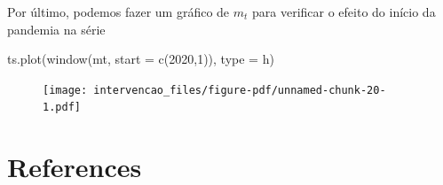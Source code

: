 \documentclass[
  letterpaper,
  DIV=11,
  numbers=noendperiod]{scrartcl}
\newenvironment{Shaded}{\begin{snugshade}}{\end{snugshade}}
\newcommand{\AttributeTok}[1]{\textcolor[rgb]{0.40,0.45,0.13}{#1}}
\newcommand{\DecValTok}[1]{\textcolor[rgb]{0.68,0.00,0.00}{#1}}
\newcommand{\FunctionTok}[1]{\textcolor[rgb]{0.28,0.35,0.67}{#1}}
\newcommand{\NormalTok}[1]{\textcolor[rgb]{0.00,0.23,0.31}{#1}}
\newcommand{\StringTok}[1]{\textcolor[rgb]{0.13,0.47,0.30}{#1}}
\newlength{\cslhangindent}
\newlength{\cslentryspacingunit} %
\newenvironment{CSLReferences}[2] %
 {%
  \setlength{\parindent}{0pt}
  \ifodd #1
  \let\oldpar\par
  \def\par{\hangindent=\cslhangindent\oldpar}
  \fi
  \setlength{\parskip}{#2\cslentryspacingunit}
 }%
 {}
\theoremstyle{plain}
\theoremstyle{plain}
\theoremstyle{definition}
\theoremstyle{definition}
\theoremstyle{remark}
\begin{document}
Por último, podemos fazer um gráfico de \(m_t\) para verificar o efeito
do início da pandemia na série

\begin{Shaded}
\begin{Highlighting}[]
\FunctionTok{ts.plot}\NormalTok{(}\FunctionTok{window}\NormalTok{(mt, }\AttributeTok{start =} \FunctionTok{c}\NormalTok{(}\DecValTok{2020}\NormalTok{,}\DecValTok{1}\NormalTok{)), }\AttributeTok{type =} \StringTok{\textquotesingle{}h\textquotesingle{}}\NormalTok{)}
\end{Highlighting}
\end{Shaded}

\begin{figure}[H]

{\centering \texttt{[image: intervencao\_files/figure-pdf/unnamed-chunk-20-1.pdf]}

}

\end{figure}


\hypertarget{references}{%
\chapter*{References}\label{references}}


\hypertarget{refs}{}
\begin{CSLReferences}{0}{0}
\end{CSLReferences}
\end{document}
